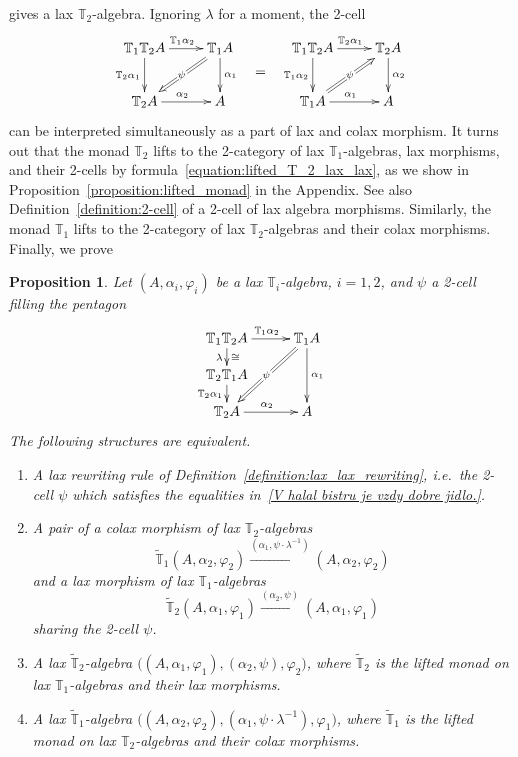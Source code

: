 \documentclass[12pt,leqno]{amsart}
\newtheorem{proposition}[theorem]{Proposition}
\theoremstyle{definition}
\def\T{\mathbb{T}}
\newcommand{\4}{\texttt{4}}
\renewcommand{\phi}{\varphi}
\begin{document}
gives a lax $\T_2$-algebra. 
Ignoring $\lambda$ for a moment, the 2-cell 
\[
\xymatrix{
\T_1\T_2 A \ar[r]^{\T_1\alpha_2}    
\ar[d]_{\T_2\alpha_1} 
& \T_1 A \ar[d]^{\alpha_1}   \ar@{=>}[dl]|{\psi\rule{.1em}{0pt}}
\\
\T_2A   \ar[r]^{\alpha_2}    &A 
}
\hskip 1em
\raisebox{-1.7em}{$=$} \hskip 1em 
\xymatrix{
\T_1\T_2 A \ar[r]^{\T_2\alpha_1}    
\ar[d]_{\T_1\alpha_2} 
& \T_2 A \ar[d]^{\alpha_2}   \ar@{<=}[dl]|{\psi\rule{.1em}{0pt}}
\\
\T_1A   \ar[r]^{\alpha_1}    &A 
}
\]
can be interpreted simultaneously as a part of lax and colax morphism. 
It turns out that the monad $\T_2$ lifts to the 2-category of lax
$\T_1$-algebras, lax morphisms, and their 2-cells by formula~\eqref{equation:lifted_T_2_lax_lax}, as we show in
Proposition~\ref{proposition:lifted_monad} in the Appendix. See also Definition~\ref{definition:2-cell} of a 2-cell of lax algebra morphisms. Similarly,
the monad $\T_1$ lifts to the 2-category of lax $\T_2$-algebras and
their colax morphisms. Finally, we prove


\begin{proposition}
\label{proposition:lax_lax_characterization}
Let $(A, \alpha_i,\phi_i)$ be a lax $\T_i$-algebra, $i=1,2$, and $\psi$ a 2-cell filling the pentagon
\begin{equation}
\label{V nedeli bude ke 40.}
\xymatrix@C=2.7em@R=1.2em{
\T_1\T_2 A \ar[r]^{\T_1\alpha_2} \ar[d]_\lambda^\cong    
& \T_1 A \ar[dd]^{\alpha_1}   \ar@{=>}[ddl]|{\psi\rule{.1em}{0pt}}
\\
\T_2 \T_1 A
\ar[d]_{\T_2\alpha_1} 
\\
\T_2A   \ar[r]^{\alpha_2}    &A 
}
\end{equation}
The following structures are equivalent.
\begin{enumerate}[topsep=0pt, partopsep=0pt, itemsep=0pt, itemindent=-1em]
\item 
A lax rewriting rule of
Definition~\ref{definition:lax_lax_rewriting}, 
i.e.~the 2-cell $\psi$ 
which satisfies the equalities in~\eqref{V halal bistru je vzdy dobre jidlo.}.
\item A pair of a colax morphism of lax $\T_2$-algebras
\[
\widetilde{\T}_1(A,
\alpha_2,\phi_2)\xrightarrow{(\alpha_1,\psi\cdot \lambda^{-1})}(A, \alpha_2,\phi_2)
\]
and a lax morphism of lax $\T_1$-algebras 
\[\widetilde{\T}_2(A, \alpha_1,\phi_1)\xrightarrow{(\alpha_2,\psi)}(A, \alpha_1,\phi_1)\]
sharing the 2-cell $\psi$.
\item 
    A lax $\widetilde{\T}_2$-algebra
    $\big((A,\alpha_1,\phi_1),(\alpha_2,\psi),\phi_2\big)$, where
    $\widetilde{\T}_2$ is the lifted monad on 
lax $\T_1$-alge\-bras and their lax morphisms.
\item A lax $\widetilde{\T}_1$-algebra
  $\big((A,\alpha_2,\phi_2),(\alpha_1,\psi\cdot \lambda^{-1}),\phi_1\big)$, where
  $\widetilde{\T}_1$ is the lifted monad on lax $\T_2$-alge\-bras and
  their colax morphisms.
\end{enumerate}
\end{proposition}
\end{document}
